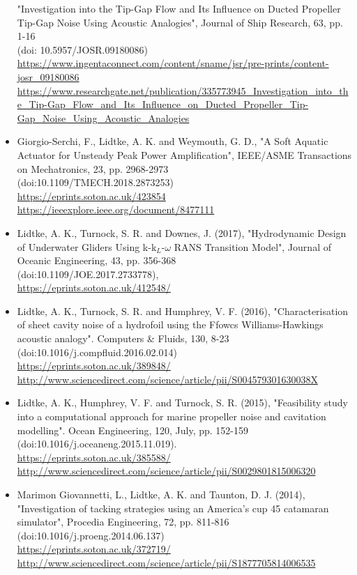 \documentclass[a4paper,10pt]{article}
\begin{document}
\begin{itemize}
	"Investigation into the Tip-Gap Flow and Its Influence on Ducted Propeller Tip-Gap Noise Using Acoustic Analogies",
	Journal of Ship Research, 63, pp. 1-16
	\cite{Higgens2020}
	\\ (doi: 10.5957/JOSR.09180086)
	\\ \url{https://www.ingentaconnect.com/content/sname/jsr/pre-prints/content-josr_09180086}
	\\ \url{https://www.researchgate.net/publication/335773945_Investigation_into_the_Tip-Gap_Flow_and_Its_Influence_on_Ducted_Propeller_Tip-Gap_Noise_Using_Acoustic_Analogies}
%
\item Giorgio-Serchi, F., Lidtke, A. K. and Weymouth, G. D.,
	"A Soft Aquatic Actuator for Unsteady Peak Power Amplification",
	IEEE/ASME Transactions on Mechatronics, 23, pp. 2968-2973
	\cite{GiorgioSerchi2018}
	\\ (doi:10.1109/TMECH.2018.2873253)
	\\ \url{https://eprints.soton.ac.uk/423854}
	\\ \url{https://ieeexplore.ieee.org/document/8477111}
%
\item Lidtke, A. K., Turnock, S. R. and Downes, J. (2017),
	"Hydrodynamic Design of Underwater Gliders Using k-k$_L$-$\omega$ RANS Transition Model",
	Journal of Oceanic Engineering, 43, pp. 356-368
	\cite{Lidtke2017}
	\\ (doi:10.1109/JOE.2017.2733778),
	\\ \url{https://eprints.soton.ac.uk/412548/}
%
\item Lidtke, A. K., Turnock, S. R. and Humphrey, V. F. (2016), "Characterisation
	of sheet cavity noise of a hydrofoil using the Ffowcs Williams-Hawkings acoustic
	analogy". Computers \& Fluids, 130, 8-23
	\cite{Lidtke2016}
	\\ (doi:10.1016/j.compfluid.2016.02.014)
	\\ \url{https://eprints.soton.ac.uk/389848/}
	\\ \url{http://www.sciencedirect.com/science/article/pii/S004579301630038X}
%
\item Lidtke, A. K., Humphrey, V. F. and Turnock, S. R. (2015), "Feasibility study
	into a computational approach for marine propeller noise and cavitation modelling".
	Ocean Engineering, 120, July, pp. 152-159
	\cite{Lidtke2016a}
	\\ (doi:10.1016/j.oceaneng.2015.11.019).
	\\ \url{https://eprints.soton.ac.uk/385588/}
	\\ \url{http://www.sciencedirect.com/science/article/pii/S0029801815006320}
%
\item Marimon Giovannetti, L., Lidtke, A. K. and Taunton, D. J. (2014), "Investigation
	of tacking strategies using an America's cup 45 catamaran simulator", Procedia
	Engineering, 72, pp. 811-816
	\cite{Giovannetti2014}
	\\ (doi:10.1016/j.proeng.2014.06.137)
	\\ \url{https://eprints.soton.ac.uk/372719/}
	\\ \url{http://www.sciencedirect.com/science/article/pii/S1877705814006535}
%
\end{itemize}
\end{document}
